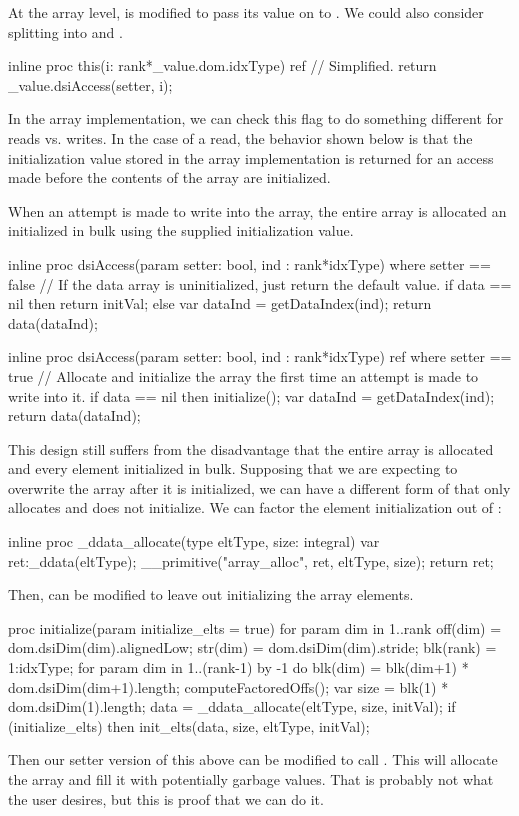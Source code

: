 At the array level,  is modified to pass its value on to .
We could also consider splitting  into  and .
\begin{chapel}
    inline proc this(i: rank*_value.dom.idxType) ref {
      // Simplified.
      return _value.dsiAccess(setter, i);
    }
\end{chapel}
\noindent
In the array implementation, we can check this flag to do something different for reads
vs. writes.  In the case of a read, the behavior shown below is that the initialization
value stored in the array implementation is returned for an access made before the
contents of the array are initialized.

When an attempt is made to write into the array, the entire array is allocated an
initialized in bulk using the supplied initialization value.
\begin{chapel}
    inline proc dsiAccess(param setter: bool, ind : rank*idxType) 
    where setter == false
    {
      // If the data array is uninitialized, just return the default value.
      if data == nil then
        return initVal;
      else {
        var dataInd = getDataIndex(ind);
        return data(dataInd);
      }
    }

    inline proc dsiAccess(param setter: bool, ind : rank*idxType) ref
    where setter == true
    {
      // Allocate and initialize the array the first time an attempt is made to write into it.
      if data == nil then
        initialize();
      var dataInd = getDataIndex(ind);
      return data(dataInd);
    }
\end{chapel}

This design still suffers from the disadvantage that the entire array is allocated and
every element initialized in bulk.  Supposing that we are expecting to overwrite the array
after it is initialized, we can have a different form of  that only
allocates and does not initialize.  We can factor the element initialization out of
:
\begin{chapel}
  inline proc _ddata_allocate(type eltType, size: integral) {
    var ret:_ddata(eltType);
    __primitive("array_alloc", ret, eltType, size);
    return ret;
  }
\end{chapel}
Then,  can be modified to leave out initializing the array elements.
\begin{chapel}
    proc initialize(param initialize_elts = true) {
      for param dim in 1..rank {
        off(dim) = dom.dsiDim(dim).alignedLow;
        str(dim) = dom.dsiDim(dim).stride;
      }
      blk(rank) = 1:idxType;
      for param dim in 1..(rank-1) by -1 do
        blk(dim) = blk(dim+1) * dom.dsiDim(dim+1).length;
      computeFactoredOffs();
      var size = blk(1) * dom.dsiDim(1).length;
      data = _ddata_allocate(eltType, size, initVal);
      if (initialize_elts) then
        init_elts(data, size, eltType, initVal);
    }
\end{chapel}
Then our setter version of this above can be modified to call .
This will allocate the array and fill it with potentially garbage values.  That is
probably not what the user desires, but this is proof that we can do it.

